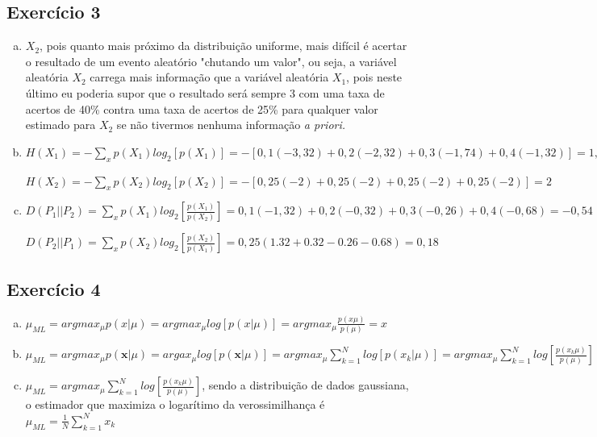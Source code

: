 \documentclass[a4paper, 12pt]{article}
\begin{document}
\subsection*{Exercício 3}

\begin{enumerate}[a)]
\item
$X_2$, pois quanto mais próximo da distribuição uniforme, mais difícil é acertar o resultado de um evento aleatório "chutando um valor", ou seja, a variável aleatória $X_2$ carrega mais informação que a variável aleatória $X_1$, pois neste último eu poderia supor que o resultado será sempre 3 com uma taxa de acertos de 40\% contra uma taxa de acertos de 25\% para qualquer valor estimado para $X_2$ se não tivermos nenhuma informação \em a priori\em .


\item
$H(X_1) = - \sum\limits_x p(X_1)log_2[p(X_1)] = -[0,1(-3,32) + 0,2(-2,32) + 0,3(-1,74) + 0,4(-1,32)] = 1,85$

$H(X_2) = - \sum\limits_x p(X_2)log_2[p(X_2)] = - [0,25 (-2) + 0,25 (-2) + 0,25 (-2) + 0,25(-2)] = 2$


\item
$D(P_1 || P_2) = \sum\limits_x p(X_1)log_2\left[\frac{p(X_1)}{p(X_2)}\right] = 0,1(-1,32) + 0,2(-0,32) + 0,3(-0,26) + 0,4(-0,68) = -0,54$

$D(P_2 || P_1) = \sum\limits_x p(X_2)log_2\left[\frac{p(X_2)}{p(X_1)}\right] = 0,25(1.32 +  0.32 - 0.26 -0.68) = 0,18$

\end{enumerate}

\subsection*{Exercício 4}

\begin{enumerate}[a)]
\item
$\mu_{ML} = arg max_\mu p(x|\mu) = arg max_\mu log[p(x|\mu)] = arg max_\mu \frac{p(x\mu)}{p(\mu)} = x$

\item
$\mu_{ML} = arg max_\mu p(\mathbf{x}|\mu) = arg ax_\mu log[p(\mathbf{x}|\mu)] = arg max_\mu \sum\limits_{k=1}^{N} log[p(x_k|\mu)] = arg max_\mu \sum \limits_{k=1}^{N} log\left [ \frac{p(x_k\mu)}{p(\mu)}\right ] $

\item

    $\mu_{ML} = arg max_\mu \sum \limits_{k=1}^{N} log\left [ \frac{p(x_k\mu)}{p(\mu)}\right ]$, sendo a distribuição de dados gaussiana, o estimador que maximiza o logarítimo da verossimilhança é $\mu_{ML} = \frac{1}{N} \sum \limits_{k=1}^{N} x_k$

\end{enumerate}
\end{document}
